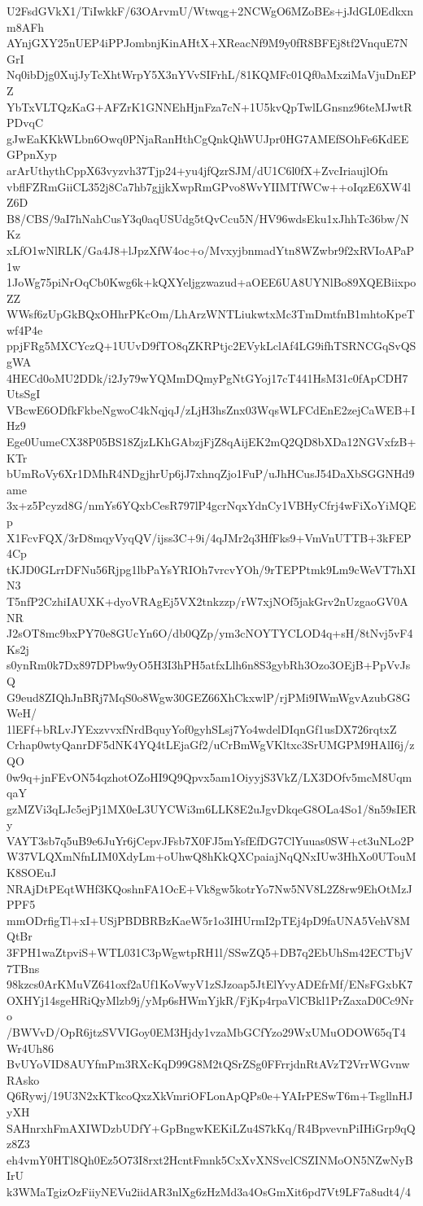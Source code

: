 U2FsdGVkX1/TiIwkkF/63OArvmU/Wtwqg+2NCWgO6MZoBEs+jJdGL0Edkxnm8AFh
AYnjGXY25nUEP4iPPJombnjKinAHtX+XReacNf9M9y0fR8BFEj8tf2VnquE7NGrI
Nq0ibDjg0XujJyTcXhtWrpY5X3nYVvSIFrhL/81KQMFc01Qf0aMxziMaVjuDnEPZ
YbTxVLTQzKaG+AFZrK1GNNEhHjnFza7cN+1U5kvQpTwlLGnsnz96teMJwtRPDvqC
gJwEaKKkWLbn6Owq0PNjaRanHthCgQnkQhWUJpr0HG7AMEfSOhFe6KdEEGPpnXyp
arArUthythCppX63vyzvh37Tjp24+yu4jfQzrSJM/dU1C6l0fX+ZvcIriaujlOfn
vbflFZRmGiiCL352j8Ca7hb7gjjkXwpRmGPvo8WvYIIMTfWCw++oIqzE6XW4lZ6D
B8/CBS/9aI7hNahCusY3q0aqUSUdg5tQvCcu5N/HV96wdsEku1xJhhTc36bw/NKz
xLfO1wNlRLK/Ga4J8+lJpzXfW4oc+o/MvxyjbnmadYtn8WZwbr9f2xRVIoAPaP1w
1JoWg75piNrOqCb0Kwg6k+kQXYeljgzwazud+aOEE6UA8UYNlBo89XQEBiixpoZZ
WWsf6zUpGkBQxOHhrPKcOm/LhArzWNTLiukwtxMc3TmDmtfnB1mhtoKpeTwf4P4e
ppjFRg5MXCYczQ+1UUvD9fTO8qZKRPtjc2EVykLclAf4LG9ifhTSRNCGqSvQSgWA
4HECd0oMU2DDk/i2Jy79wYQMmDQmyPgNtGYoj17cT441HsM31c0fApCDH7UtsSgI
VBcwE6ODfkFkbeNgwoC4kNqjqJ/zLjH3hsZnx03WqsWLFCdEnE2zejCaWEB+IHz9
Ege0UumeCX38P05BS18ZjzLKhGAbzjFjZ8qAijEK2mQ2QD8bXDa12NGVxfzB+KTr
bUmRoVy6Xr1DMhR4NDgjhrUp6jJ7xhnqZjo1FuP/uJhHCusJ54DaXbSGGNHd9ame
3x+z5Pcyzd8G/nmYs6YQxbCesR797lP4gcrNqxYdnCy1VBHyCfrj4wFiXoYiMQEp
X1FcvFQX/3rD8mqyVyqQV/ijss3C+9i/4qJMr2q3HfFks9+VmVnUTTB+3kFEP4Cp
tKJD0GLrrDFNu56Rjpg1lbPaYsYRIOh7vrcvYOh/9rTEPPtmk9Lm9cWeVT7hXIN3
T5nfP2CzhiIAUXK+dyoVRAgEj5VX2tnkzzp/rW7xjNOf5jakGrv2nUzgaoGV0ANR
J2sOT8mc9bxPY70e8GUcYn6O/db0QZp/ym3cNOYTYCLOD4q+sH/8tNvj5vF4Ks2j
s0ynRm0k7Dx897DPbw9yO5H3I3hPH5atfxLlh6n8S3gybRh3Ozo3OEjB+PpVvJsQ
G9eud8ZIQhJnBRj7MqS0o8Wgw30GEZ66XhCkxwlP/rjPMi9IWmWgvAzubG8GWeH/
1lEFf+bRLvJYExzvvxfNrdBquyYof0gyhSLsj7Yo4wdelDIqnGf1usDX726rqtxZ
Crhap0wtyQanrDF5dNK4YQ4tLEjaGf2/uCrBmWgVKltxc3SrUMGPM9HAlI6j/zQO
0w9q+jnFEvON54qzhotOZoHI9Q9Qpvx5am1OiyyjS3VkZ/LX3DOfv5mcM8UqmqaY
gzMZVi3qLJc5ejPj1MX0eL3UYCWi3m6LLK8E2uJgvDkqeG8OLa4So1/8n59sIERy
VAYT3sb7q5uB9e6JuYr6jCepvJFsb7X0FJ5mYsfEfDG7ClYuuas0SW+ct3uNLo2P
W37VLQXmNfnLIM0XdyLm+oUhwQ8hKkQXCpaiajNqQNxIUw3HhXo0UTouMK8SOEuJ
NRAjDtPEqtWHf3KQoshnFA1OcE+Vk8gw5kotrYo7Nw5NV8L2Z8rw9EhOtMzJPPF5
mmODrfigTl+xI+USjPBDBRBzKaeW5r1o3IHUrmI2pTEj4pD9faUNA5VehV8MQtBr
3FPH1waZtpviS+WTL031C3pWgwtpRH1l/SSwZQ5+DB7q2EbUhSm42ECTbjV7TBns
98kzcs0ArKMuVZ641oxf2aUf1KoVwyV1zSJzoap5JtElYvyADEfrMf/ENsFGxbK7
OXHYj14sgeHRiQyMlzb9j/yMp6sHWmYjkR/FjKp4rpaVlCBkl1PrZaxaD0Cc9Nro
/BWVvD/OpR6jtzSVVIGoy0EM3Hjdy1vzaMbGCfYzo29WxUMuODOW65qT4Wr4Uh86
BvUYoVID8AUYfmPm3RXcKqD99G8M2tQSrZSg0FFrrjdnRtAVzT2VrrWGvnwRAsko
Q6Rywj/19U3N2xKTkcoQxzXkVmriOFLonApQPs0e+YAIrPESwT6m+TsgllnHJyXH
SAHnrxhFmAXIWDzbUDfY+GpBngwKEKiLZu4S7kKq/R4BpvevnPiIHiGrp9qQz8Z3
eh4vmY0HTl8Qh0Ez5O73I8rxt2HcntFmnk5CxXvXNSvclCSZINMoON5NZwNyBIrU
k3WMaTgizOzFiiyNEVu2iidAR3nlXg6zHzMd3a4OsGmXit6pd7Vt9LF7a8udt4/4
